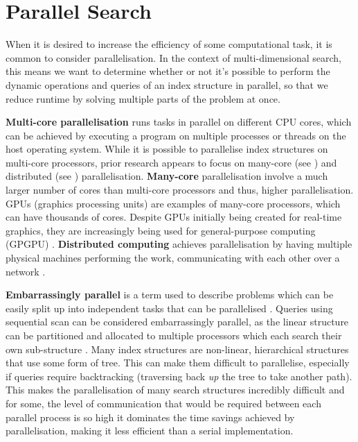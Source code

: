 \section{Parallel Search}

When it is desired to increase the efficiency of some computational task, it is common to consider parallelisation. In the context of multi-dimensional search, this means we want to determine whether or not it's possible to perform the dynamic operations and queries of an index structure in parallel, so that we reduce runtime by solving multiple parts of the problem at once.

\textbf{Multi-core parallelisation} runs tasks in parallel on different CPU cores, which can be achieved by executing a program on multiple processes or threads on the host operating system. While it is possible to parallelise index structures on multi-core processors, prior research appears to focus on many-core (see  \cite{btree-gpu1, btree-gpu2, btree-gpu3, traversing-spatial-indexes-gpu, rtree-gpu1, rtree-gpu2}) and distributed (see \cite{fat-btree, distributed-kd-tree, distributed-md-search}) parallelisation. \textbf{Many-core} parallelisation involve a much larger number of cores than multi-core processors and thus, higher parallelisation. GPUs (graphics processing units) are examples of many-core processors, which can have thousands of cores. Despite GPUs initially being created for real-time graphics, they are increasingly being used for general-purpose computing (GPGPU) \cite{performance-tuning-gpgpu}. \textbf{Distributed computing} achieves parallelisation by having multiple physical machines performing the work, communicating with each other over a network \cite{distributed-systems}.

\textbf{Embarrassingly parallel} is a term used to describe problems which can be easily split up into independent tasks that can be parallelised \cite{designing-parallel-programs}. Queries using sequential scan can be considered embarrassingly parallel, as the linear structure can be partitioned and allocated to multiple processors which each search their own sub-structure \cite{gpu-gems-3}. Many index structures are non-linear, hierarchical structures that use some form of tree. This can make them difficult to parallelise, especially if queries require backtracking (traversing back \textit{up} the tree to take another path). This makes the parallelisation of many search structures incredibly difficult and for some, the level of communication that would be required between each parallel process is so high it dominates the time savings achieved by parallelisation, making it less efficient than a serial implementation.

